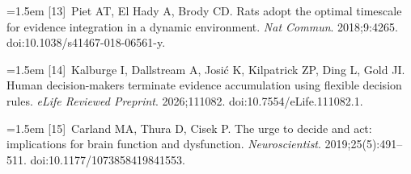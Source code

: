 \documentclass[12pt,letterpaper]{article}
\newcommand{\bibitemn}[2]{\noindent\hangindent=1.5em\hangafter=1 [#1]~#2\par\vspace{1pt}}
\begin{document}
\bibitemn{13}{Piet AT, El Hady A, Brody CD. Rats adopt the optimal timescale for evidence integration in a dynamic environment. \textit{Nat Commun}. 2018;9:4265. doi:10.1038/s41467-018-06561-y.}
\bibitemn{14}{Kalburge I, Dallstream A, Josi\'c K, Kilpatrick ZP, Ding L, Gold JI. Human decision-makers terminate evidence accumulation using flexible decision rules. \textit{eLife Reviewed Preprint}. 2026;111082. doi:10.7554/eLife.111082.1.}
\bibitemn{15}{Carland MA, Thura D, Cisek P. The urge to decide and act: implications for brain function and dysfunction. \textit{Neuroscientist}. 2019;25(5):491--511. doi:10.1177/1073858419841553.}
\end{document}
